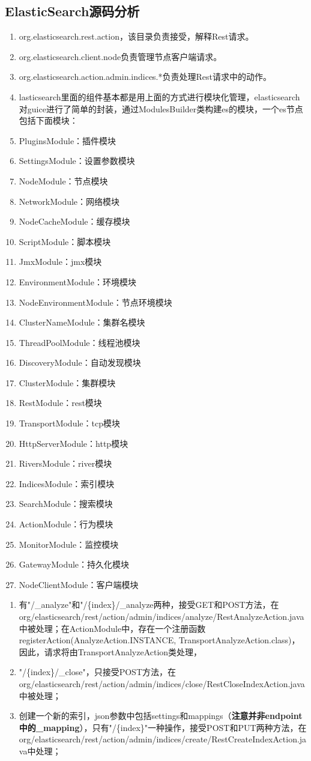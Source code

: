 \subsection{ElasticSearch源码分析}
\begin{enumerate}[(1)]
\item org.elasticsearch.rest.action，该目录负责接受，解释Rest请求。
\item org.elasticsearch.client.node负责管理节点客户端请求。
\item org.elasticsearch.action.admin.indices.*负责处理Rest请求中的动作。
\item lasticsearch里面的组件基本都是用上面的方式进行模块化管理，elasticsearch对guice进行了简单的封装，通过ModulesBuilder类构建es的模块，一个es节点包括下面模块：
\item PluginsModule：插件模块
\item SettingsModule：设置参数模块
\item NodeModule：节点模块
\item NetworkModule：网络模块
\item NodeCacheModule：缓存模块
\item ScriptModule：脚本模块
\item JmxModule：jmx模块
\item EnvironmentModule：环境模块
\item NodeEnvironmentModule：节点环境模块
\item ClusterNameModule：集群名模块
\item ThreadPoolModule：线程池模块
\item DiscoveryModule：自动发现模块
\item ClusterModule：集群模块
\item RestModule：rest模块
\item TransportModule：tcp模块
\item HttpServerModule：http模块
\item RiversModule：river模块
\item IndicesModule：索引模块
\item SearchModule：搜索模块
\item ActionModule：行为模块
\item MonitorModule：监控模块
\item GatewayModule：持久化模块
\item NodeClientModule：客户端模块
\end{enumerate}
\begin{enumerate}[(1)]
\item 有"/\_analyze"和"/\{index\}/\_analyze两种，接受GET和POST方法，在org/elasticsearch/rest/action/admin/indices/analyze/RestAnalyzeAction.java中被处理；在ActionModule中，存在一个注册函数registerAction(AnalyzeAction.INSTANCE, TransportAnalyzeAction.class)，因此，请求将由TransportAnalyzeAction类处理，
\item "/\{index\}/\_close"，只接受POST方法，在org/elasticsearch/rest/action/admin/indices/close/RestCloseIndexAction.java中被处理；
\item  创建一个新的索引，json参数中包括settings和mappings（\textbf{注意并非endpoint中的\_mapping}），只有"/\{index\}"一种操作，接受POST和PUT两种方法，在org/elasticsearch/rest/action/admin/indices/create/RestCreateIndexAction.java中处理；
\end{enumerate}
